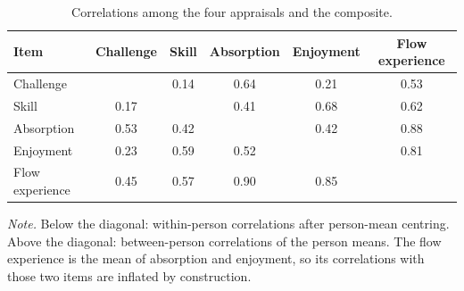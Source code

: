 \begin{table}[!htbp]
\raggedright
\caption{Correlations among the four appraisals and the composite.}
\label{tab:sup-itemcorr}
\footnotesize
\begingroup
\setlength{\tabcolsep}{4pt}
\renewcommand{\arraystretch}{1.08}
\noindent
\begin{tabular*}{\textwidth}{@{\extracolsep{\fill}}lccccc@{}}
\toprule
Item & Challenge & Skill & Absorption & Enjoyment & Flow experience \\
\midrule
Challenge &  & 0.14 & 0.64 & 0.21 & 0.53 \\
Skill & 0.17 &  & 0.41 & 0.68 & 0.62 \\
Absorption & 0.53 & 0.42 &  & 0.42 & 0.88 \\
Enjoyment & 0.23 & 0.59 & 0.52 &  & 0.81 \\
Flow experience & 0.45 & 0.57 & 0.90 & 0.85 &  \\
\bottomrule
\end{tabular*}
\par\vspace{3pt}\noindent\parbox{\textwidth}{\footnotesize\textit{Note.} Below the diagonal: within-person correlations after person-mean centring. Above the diagonal: between-person correlations of the person means. The flow experience is the mean of absorption and enjoyment, so its correlations with those two items are inflated by construction.}
\endgroup
\end{table}
